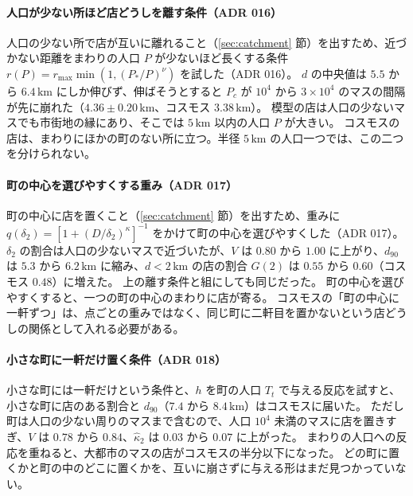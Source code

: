 \documentclass[a4paper,11pt]{ltjsarticle}
\begin{document}
\paragraph{人口が少ない所ほど店どうしを離す条件（ADR 016）}
人口の少ない所で店が互いに離れること（\ref{sec:catchment} 節）を出すため、近づかない距離をまわりの人口 $P$ が少ないほど長くする条件 $r(P) = r_{\max} \min(1, (P_*/P)^{\nu})$ を試した（ADR 016）。
$d$ の中央値は $5.5$ から $6.4\,\mathrm{km}$ にしか伸びず、伸ばそうとすると $P_c$ が $10^4$ から $3 \times 10^4$ のマスの間隔が先に崩れた（$4.36 \pm 0.20\,\mathrm{km}$、コスモス $3.38\,\mathrm{km}$）。
模型の店は人口の少ないマスでも市街地の縁にあり、そこでは $5\,\mathrm{km}$ 以内の人口 $P$ が大きい。
コスモスの店は、まわりにほかの町のない所に立つ。半径 $5\,\mathrm{km}$ の人口一つでは、この二つを分けられない。

\paragraph{町の中心を選びやすくする重み（ADR 017）}
町の中心に店を置くこと（\ref{sec:catchment} 節）を出すため、重みに $q(\delta_2) = [1 + (D/\delta_2)^{\kappa}]^{-1}$ をかけて町の中心を選びやすくした（ADR 017）。
$\delta_2$ の割合は人口の少ないマスで近づいたが、$V$ は $0.80$ から $1.00$ に上がり、$d_{90}$ は $5.3$ から $6.2\,\mathrm{km}$ に縮み、$d < 2\,\mathrm{km}$ の店の割合 $G(2)$ は $0.55$ から $0.60$（コスモス $0.48$）に増えた。
上の離す条件と組にしても同じだった。
町の中心を選びやすくすると、一つの町の中心のまわりに店が寄る。
コスモスの「町の中心に一軒ずつ」は、点ごとの重みではなく、同じ町に二軒目を置かないという店どうしの関係として入れる必要がある。

\paragraph{小さな町に一軒だけ置く条件（ADR 018）}
小さな町には一軒だけという条件と、$h$ を町の人口 $T_t$ で与える反応を試すと、小さな町に店のある割合と $d_{90}$（$7.4$ から $8.4\,\mathrm{km}$）はコスモスに届いた。
ただし町は人口の少ない周りのマスまで含むので、人口 $10^4$ 未満のマスに店を置きすぎ、$V$ は $0.78$ から $0.84$、$\hat\kappa_2$ は $0.03$ から $0.07$ に上がった。
まわりの人口への反応を重ねると、大都市のマスの店がコスモスの半分以下になった。
どの町に置くかと町の中のどこに置くかを、互いに崩さずに与える形はまだ見つかっていない。
\end{document}
